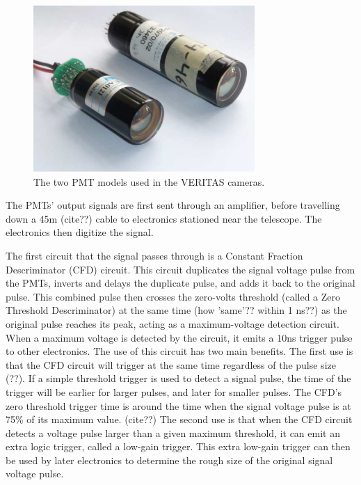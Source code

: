 \begin{figure}[h]
  \begin{center}
    \includegraphics[width=0.75\textwidth]{images/pmt_models}
    \caption[PMT Models]{The two PMT models used in the VERITAS cameras. \cite{pmtmodels}}\label{fig:pmtmodels}
  \end{center}
\end{figure}

The PMTs' output signals are first sent through an amplifier, before travelling down a \nicetilde45m (cite??) cable to electronics stationed near the telescope.
The electronics then digitize the signal.

The first circuit that the signal passes through is a Constant Fraction Descriminator (CFD) circuit.
This circuit duplicates the signal voltage pulse from the PMTs, inverts and delays the duplicate pulse, and adds it back to the original pulse.
This combined pulse then crosses the zero-volts threshold (called a Zero Threshold Descriminator) at the same time (how 'same'?? within 1 ns??) as the original pulse reaches its peak, acting as a maximum-voltage detection circuit.
When a maximum voltage is detected by the circuit, it emits a 10ns trigger pulse to other electronics.
The use of this circuit has two main benefits.
The first use is that the CFD circuit will trigger at the same time regardless of the pulse size (??).
If a simple threshold trigger is used to detect a signal pulse, the time of the trigger will be earlier for larger pulses, and later for smaller pulses.
The CFD's zero threshold trigger time is around the time when the signal voltage pulse is at 75\% of its maximum value. (cite??)
The second use is that when the CFD circuit detects a voltage pulse larger than a given maximum threshold, it can emit an extra logic trigger, called a low-gain trigger.
This extra low-gain trigger can then be used by later electronics to determine the rough size of the original signal voltage pulse.

